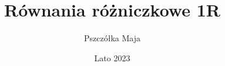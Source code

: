\documentclass{article}
\title{Równania różniczkowe 1R}
\author{Pszczółka Maja}
\date{Lato 2023}
\begin{document}
\maketit

\tableofcontents
\newpage


\end{document}
